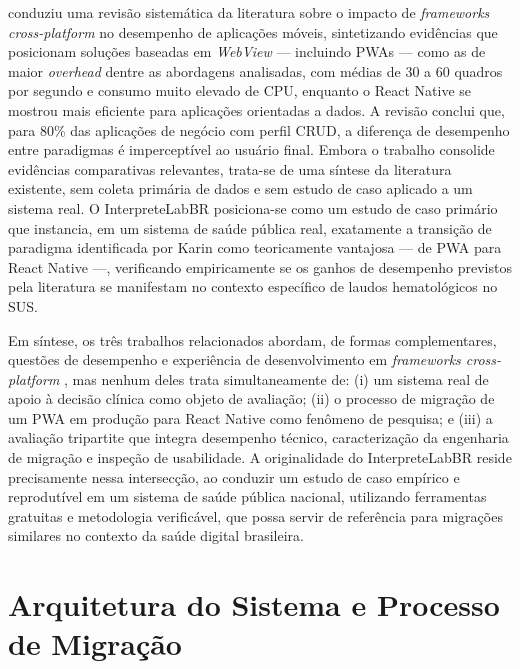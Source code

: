 \documentclass[12pt]{article}
\begin{document}
\cite{karin2025} conduziu uma revisão sistemática da literatura sobre o
impacto de \textit{frameworks cross-platform} no desempenho de aplicações
móveis, sintetizando evidências que posicionam soluções baseadas em
\textit{WebView} — incluindo PWAs — como as de maior \textit{overhead}
dentre as abordagens analisadas, com médias de 30 a 60 quadros por segundo
e consumo muito elevado de CPU, enquanto o React Native se mostrou mais
eficiente para aplicações orientadas a dados. A revisão conclui que, para
80\% das aplicações de negócio com perfil CRUD, a diferença de desempenho
entre paradigmas é imperceptível ao usuário final. Embora o trabalho
consolide evidências comparativas relevantes, trata-se de uma síntese da
literatura existente, sem coleta primária de dados e sem estudo de caso
aplicado a um sistema real. O InterpreteLabBR posiciona-se como um estudo
de caso primário que instancia, em um sistema de saúde pública real,
exatamente a transição de paradigma identificada por Karin como
teoricamente vantajosa — de PWA para React Native —, verificando
empiricamente se os ganhos de desempenho previstos pela literatura se
manifestam no contexto específico de laudos hematológicos no SUS.

Em síntese, os três trabalhos relacionados abordam, de formas
complementares, questões de desempenho e experiência de desenvolvimento em
\textit{frameworks cross-platform} \cite{sokolov2025,zhou2024,karin2025},
mas nenhum deles trata simultaneamente de: (i) um sistema real de apoio à
decisão clínica como objeto de avaliação; (ii) o processo de migração de
um PWA em produção para React Native como fenômeno de pesquisa; e (iii) a
avaliação tripartite que integra desempenho técnico, caracterização da
engenharia de migração e inspeção de usabilidade. A originalidade do
InterpreteLabBR reside precisamente nessa intersecção, ao conduzir um
estudo de caso empírico e reprodutível em um sistema de saúde pública
nacional, utilizando ferramentas gratuitas e metodologia verificável, que
possa servir de referência para migrações similares no contexto da saúde
digital brasileira.

\section{Arquitetura do Sistema e Processo de Migração}
\end{document}
